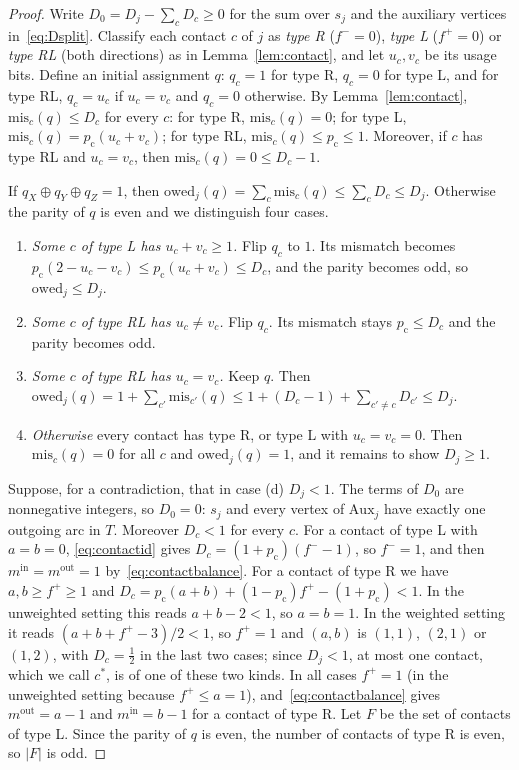 \documentclass[11pt]{amsart}
\theoremstyle{definition}
\theoremstyle{remark}
\numberwithin{equation}{section}
\newcommand{\owed}{\mathrm{owed}}
\newcommand{\mis}{\mathrm{mis}}
\newcommand{\Aux}{\mathrm{Aux}}
\newcommand{\pc}{p_{\mathrm{c}}}
\begin{document}
\begin{proof}
Write $D_0=D_j-\sum_cD_c\ge0$ for the sum over $s_j$ and the auxiliary vertices in~\eqref{eq:Dsplit}. Classify each contact $c$ of $j$ as \emph{type R} ($f^-=0$), \emph{type L} ($f^+=0$) or \emph{type RL} (both directions) as in Lemma~\ref{lem:contact}, and let $u_c,v_c$ be its usage bits. Define an initial assignment $q$: $q_c=1$ for type R, $q_c=0$ for type L, and for type RL, $q_c=u_c$ if $u_c=v_c$ and $q_c=0$ otherwise. By Lemma~\ref{lem:contact}, $\mis_c(q)\le D_c$ for every $c$: for type R, $\mis_c(q)=0$; for type L, $\mis_c(q)=\pc(u_c+v_c)$; for type RL, $\mis_c(q)\le\pc\le1$. Moreover, if $c$ has type RL and $u_c=v_c$, then $\mis_c(q)=0\le D_c-1$.

If $q_X\oplus q_Y\oplus q_Z=1$, then $\owed_j(q)=\sum_c\mis_c(q)\le\sum_cD_c\le D_j$. Otherwise the parity of $q$ is even and we distinguish four cases.

\begin{enumerate}[label=(\alph*),leftmargin=2.2em]
\item \emph{Some $c$ of type L has $u_c+v_c\ge1$.} Flip $q_c$ to $1$. Its mismatch becomes $\pc(2-u_c-v_c)\le\pc(u_c+v_c)\le D_c$, and the parity becomes odd, so $\owed_j\le D_j$.
\item \emph{Some $c$ of type RL has $u_c\ne v_c$.} Flip $q_c$. Its mismatch stays $\pc\le D_c$ and the parity becomes odd.
\item \emph{Some $c$ of type RL has $u_c=v_c$.} Keep $q$. Then $\owed_j(q)=1+\sum_{c'}\mis_{c'}(q)\le1+(D_c-1)+\sum_{c'\ne c}D_{c'}\le D_j$.
\item \emph{Otherwise} every contact has type R, or type L with $u_c=v_c=0$. Then $\mis_c(q)=0$ for all $c$ and $\owed_j(q)=1$, and it remains to show $D_j\ge1$.
\end{enumerate}

Suppose, for a contradiction, that in case (d) $D_j<1$. The terms of $D_0$ are nonnegative integers, so $D_0=0$: $s_j$ and every vertex of $\Aux_j$ have exactly one outgoing arc in $T$. Moreover $D_c<1$ for every $c$. For a contact of type L with $a=b=0$, \eqref{eq:contactid} gives $D_c=(1+\pc)(f^--1)$, so $f^-=1$, and then $m^{\mathrm{in}}=m^{\mathrm{out}}=1$ by~\eqref{eq:contactbalance}. For a contact of type R we have $a,b\ge f^+\ge1$ and $D_c=\pc(a+b)+(1-\pc)f^+-(1+\pc)<1$. In the unweighted setting this reads $a+b-2<1$, so $a=b=1$. In the weighted setting it reads $(a+b+f^+-3)/2<1$, so $f^+=1$ and $(a,b)$ is $(1,1)$, $(2,1)$ or $(1,2)$, with $D_c=\frac12$ in the last two cases; since $D_j<1$, at most one contact, which we call $c^*$, is of one of these two kinds. In all cases $f^+=1$ (in the unweighted setting because $f^+\le a=1$), and~\eqref{eq:contactbalance} gives $m^{\mathrm{out}}=a-1$ and $m^{\mathrm{in}}=b-1$ for a contact of type R. Let $F$ be the set of contacts of type L. Since the parity of $q$ is even, the number of contacts of type R is even, so $|F|$ is odd.


\end{proof}
\end{document}
